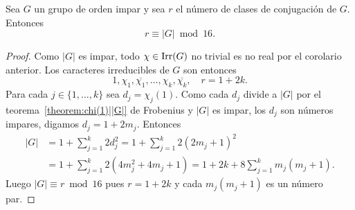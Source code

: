 \begin{theorem}[Burnside]
  Sea $G$ un grupo de orden impar y sea $r$ el número de clases de conjugación
  de $G$. Entonces 
  \[
	  r\equiv|G|\bmod{16}.
  \]
\end{theorem}

\begin{proof}
  Como $|G|$ es impar, todo $\chi\in\operatorname{Irr}(G)$ no trivial es no real por el
  corolario anterior. Los caracteres irreducibles de $G$ son entonces 
  \[
    1,\chi_1,\overline{\chi_1},\dots,\chi_k,\overline{\chi_k},
    \quad
    r=1+2k.
  \]
  Para cada $j\in\{1,\dots,k\}$ sea $d_j=\chi_j(1)$.   Como cada $d_j$ divide a
  $|G|$ por el teorema~\ref{theorem:chi(1)||G|} de Frobenius y $|G|$ es impar, los $d_j$ son
  números impares, digamos $d_j=1+2m_j$. Entonces 
  \begin{align*}
    |G|&=1+\sum_{j=1}^k 2d_j^2=1+\sum_{j=1}^k2(2m_j+1)^2\\
    &=1+\sum_{j=1}^k2(4m_j^2+4m_j+1)
    =1+2k+8\sum_{j=1}^km_j(m_j+1).
  \end{align*}
  Luego $|G|\equiv r\bmod{16}$ pues $r=1+2k$ y cada $m_j(m_j+1)$ es un número par. 
\end{proof}



